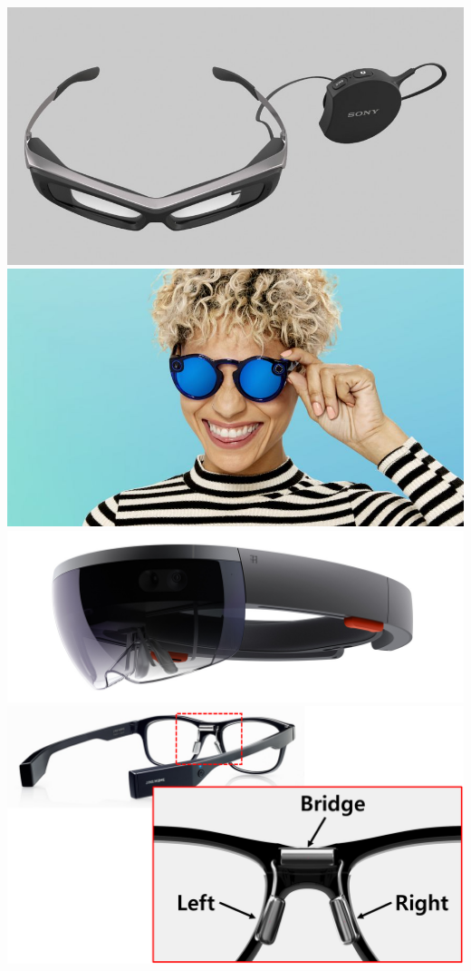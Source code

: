 \documentclass{sigchi-ext}
\begin{document}
\begin{marginfigure}[0pc]
 \begin{minipage}{\marginparwidth}
   \centering  
      \includegraphics[width=\columnwidth]{figures/sony.jpg}
         \includegraphics[width=\columnwidth]{figures/spectales.jpg}
           \includegraphics[width=\columnwidth]{figures/holo.jpg}
   \includegraphics[width=\columnwidth]{figures/1-4}


\end{minipage}
\end{marginfigure}
\end{document}
